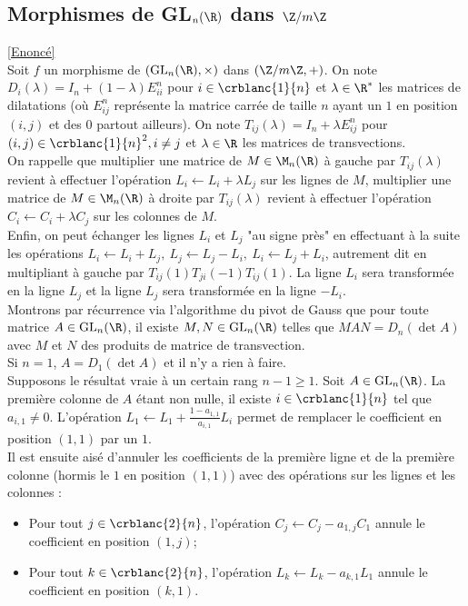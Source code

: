 \documentclass[8pt]{book}
\begin{document}
	\subsection{Morphismes de GL$_n(\R)$ dans $\Z /m\Z$ }
	\label{Morphismes de GLn(R) dans Z/mZ corrigé}
	\textcolor{blue}{\hyperref[Morphismes de GLn(R) dans Z/mZ]{[Enoncé]}}\\
	Soit $f$ un morphisme de $(\text{GL}_n(\R),\times)$ dans $(\Z/m\Z,+)$. On note $D_i(\lambda)=I_n+(1-\lambda)E^n_{ii}$ pour $i\in \crblanc{1}{n}$ et $\lambda\in \R^*$ les matrices de dilatations (où $E^n_{ij}$ représente la matrice carrée de taille $n$ ayant un $1$ en position $(i,j)$ et des $0$ partout ailleurs). On note $T_{ij}(\lambda)=I_n+\lambda E^n_{ij}$ pour $(i,j)\in \crblanc{1}{n}^2,i\ne j$ et $\lambda\in \R$ les matrices de transvections.\\
	On rappelle que multiplier une matrice de $M\in \M_n(\R)$ à gauche par $T_{ij}(\lambda)$ revient à effectuer l'opération $L_i\leftarrow L_i+\lambda L_j$ sur les lignes de $M$, multiplier une matrice de $M\in \M_n(\R)$ à droite par $T_{ij}(\lambda)$ revient à effectuer l'opération $C_i\leftarrow C_i+\lambda C_j$ sur les colonnes de $M$.\\
	Enfin, on peut échanger les lignes $L_i$ et $L_j$ "au signe près" en effectuant à la suite les opérations $L_i\leftarrow L_i+L_j,\ L_j\leftarrow L_j-L_i,\ L_i\leftarrow L_j+L_i$, autrement dit en multipliant à gauche par $T_{ij}(1)T_{ji}(-1)T_{ij}(1)$. La ligne $L_i$ sera transformée en la ligne $L_j$ et la ligne $L_j$ sera transformée en la ligne $-L_i$.\\
	Montrons par récurrence via l'algorithme du pivot de Gauss que pour toute matrice $A\in \text{GL}_n(\R)$, il existe $M,N\in \text{GL}_n(\R)$ telles que $MAN=D_n(\det A)$ avec $M$ et $N$ des produits de matrice de transvection.\\
	Si $n=1$, $A=D_1(\det A)$ et il n'y a rien à faire.\\
	Supposons le résultat vraie à un certain rang $n-1\geq 1$. Soit $A\in \text{GL}_n(\R)$. La première colonne de $A$ étant non nulle, il existe $i\in \crblanc{1}{n}$ tel que $a_{i,1}\ne 0$. L'opération $L_1\leftarrow L_1+\displaystyle\frac{1-a_{1,1}}{a_{i,1}}L_i$ permet de remplacer le coefficient en position $(1,1)$ par un $1$.\\
	Il est ensuite aisé d'annuler les coefficients de la première ligne et de la première colonne (hormis le $1$ en position $(1,1)$) avec des opérations sur les lignes et les colonnes :
	\begin{itemize}
		\item Pour tout $j\in \crblanc{2}{n}$, l'opération $C_j\leftarrow C_j-a_{1,j}C_1$ annule le coefficient en position $(1,j)$;
		\item Pour tout $k\in \crblanc{2}{n}$, l'opération $L_k\leftarrow L_k-a_{k,1}L_1$ annule le coefficient en position $(k,1)$.
	\end{itemize}
\end{document}
